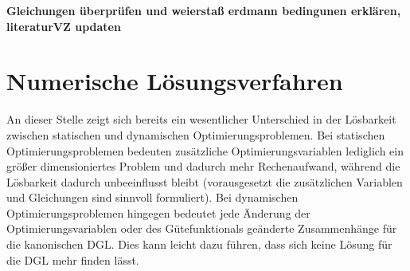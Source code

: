 \textbf{Gleichungen überprüfen und weierstaß erdmann bedingunen erklären, literaturVZ updaten}
\section{Numerische Lösungsverfahren}\label{sec:Lösungsverfahren}
An dieser Stelle zeigt sich bereits ein wesentlicher Unterschied in der Lösbarkeit zwischen statischen und dynamischen Optimierungsproblemen. Bei statischen Optimierungsproblemen bedeuten zusätzliche Optimierungsvariablen lediglich ein größer dimensioniertes Problem und dadurch mehr Rechenaufwand, während die Lösbarkeit dadurch unbeeinflusst bleibt (vorausgesetzt die zusätzlichen Variablen und Gleichungen sind sinnvoll formuliert). Bei dynamischen Optimierungsproblemen hingegen bedeutet jede Änderung der Optimierungsvariablen oder des Gütefunktionals geänderte Zusammenhänge für die kanonischen \gls{DGL}. Dies kann leicht dazu führen, dass sich keine Lösung für die \gls{DGL} mehr finden lässt. 